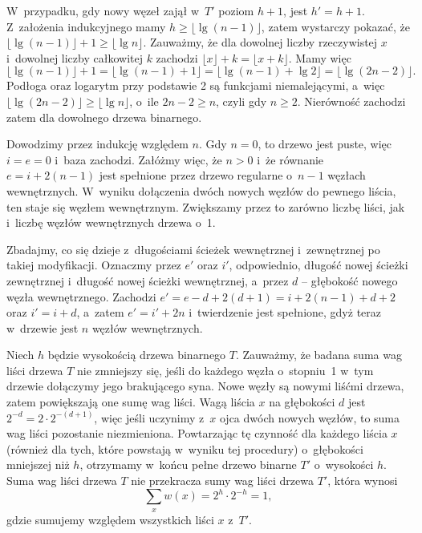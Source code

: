 W~przypadku, gdy nowy węzeł zajął w~$T'$ poziom $h+1$, jest $h'=h+1$. Z~założenia indukcyjnego mamy $h\ge\lfloor\lg(n-1)\rfloor$, zatem wystarczy pokazać, że $\lfloor\lg(n-1)\rfloor+1\ge\lfloor\lg n\rfloor$. Zauważmy, że dla dowolnej liczby rzeczywistej $x$ i~dowolnej liczby całkowitej $k$ zachodzi $\lfloor x\rfloor+k=\lfloor x+k\rfloor$. Mamy więc
\[
    \lfloor\lg(n-1)\rfloor+1 = \lfloor\lg(n-1)+1\rfloor = \lfloor\lg(n-1)+\lg2\rfloor = \lfloor\lg(2n-2)\rfloor.
\]
Podłoga oraz logarytm przy podstawie 2 są funkcjami niemalejącymi, a~więc $\lfloor\lg(2n-2)\rfloor\ge\lfloor\lg n\rfloor$, o~ile $2n-2\ge n$, czyli gdy $n\ge2$. Nierówność zachodzi zatem dla dowolnego drzewa binarnego.

\exercise %
Dowodzimy przez indukcję względem $n$. Gdy $n=0$, to drzewo jest puste, więc $i=e=0$ i~baza zachodzi. Załóżmy więc, że $n>0$ i~że równanie $e=i+2(n-1)$ jest spełnione przez drzewo regularne o~$n-1$ węzłach wewnętrznych. W~wyniku dołączenia dwóch nowych węzłów do pewnego liścia, ten staje się węzłem wewnętrznym. Zwiększamy przez to zarówno liczbę liści, jak i~liczbę węzłów wewnętrznych drzewa o~1.

Zbadajmy, co się dzieje z~długościami ścieżek wewnętrznej i~zewnętrznej po takiej modyfikacji. Oznaczmy przez $e'$ oraz $i'$, odpowiednio, długość nowej ścieżki zewnętrznej i~długość nowej ścieżki wewnętrznej, a~przez $d$ -- głębokość nowego węzła wewnętrznego. Zachodzi $e'=e-d+2(d+1)=i+2(n-1)+d+2$ oraz $i'=i+d$, a~zatem $e'=i'+2n$ i~twierdzenie jest spełnione, gdyż teraz w~drzewie jest $n$ węzłów wewnętrznych.

\exercise %
Niech $h$ będzie wysokością drzewa binarnego $T$. Zauważmy, że badana suma wag liści drzewa $T$ nie zmniejszy się, jeśli do każdego węzła o~stopniu~1 w~tym drzewie dołączymy jego brakującego syna. Nowe węzły są nowymi liśćmi drzewa, zatem powiększają one sumę wag liści. Wagą liścia $x$ na głębokości $d$ jest $2^{-d}=2\cdot2^{-(d+1)}$, więc jeśli uczynimy z~$x$ ojca dwóch nowych węzłów, to suma wag liści pozostanie niezmieniona. Powtarzając tę czynność dla każdego liścia $x$ (również dla tych, które powstają w~wyniku tej procedury) o~głębokości mniejszej niż $h$, otrzymamy w~końcu pełne drzewo binarne $T'$ o~wysokości $h$. Suma wag liści drzewa $T$ nie przekracza sumy wag liści drzewa $T'$, która wynosi
\[
	\sum_{x}w(x) = 2^h\cdot2^{-h} = 1,
\]
gdzie sumujemy względem wszystkich liści $x$ z~$T'$.

\exercise %

